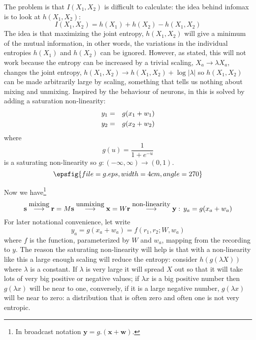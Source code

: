 \documentclass[12pt]{article}
\begin{document}
The problem is that $I(X_1,X_2)$ is difficult to calculate: the idea
behind infomax is to look at $h(X_1,X_2)$:
\begin{equation}
I(X_1,X_2)=h(X_1)+h(X_2)-h(X_1,X_2)
\end{equation}
The idea is that maximizing the joint entropy, $h(X_1,X_2)$ will give
a minimum of the mutual information, in other words, the variations in
the individual entropies $h(X_1)$ and $h(X_2)$ can be
ignored. However, as stated, this will not work because the entropy
can be increased by a trivial scaling, $X_a\rightarrow \lambda X_a$,
changes the joint entropy, $h(X_1,X_2)\rightarrow
h(X_1,X_2)+\log{|\lambda|}$ so $h(X_1,X_2)$ can be made arbitrarily
large by scaling, something that tells us nothing about mixing and
unmixing. Inspired by the behaviour of neurons, in
\cite{BellSejnowski1995} this is solved by adding a saturation
non-linearity:
\begin{eqnarray}
y_1&=&g(x_1+w_1)\cr
y_2&=&g(x_2+w_2)
\end{eqnarray}
where
\begin{equation}
g(u)=\frac{1}{1+e^{-u}}
\end{equation}
is a saturating non-linearity so $g:(-\infty,\infty)\rightarrow (0,1)$.
\begin{equation}
\epsfig{file=g.eps,width=4cm,angle=270}
\end{equation}

Now we have\footnote{In broadcast notation $\mathbf{y}=g.(\mathbf{x}+\mathbf{w})$.}
\begin{equation}
{\bf s}\stackrel{\mbox{mixing}}{\longrightarrow}{\bf r}=M{\bf s}\stackrel{\mbox{unmixing}}{\longrightarrow}{\bf x}=W{\bf r}\stackrel{\mbox{non-linearity}}{\longrightarrow}{\bf y}:\,y_a=g(x_a+w_a)
\end{equation}
For later notational convenience, let write
\begin{equation}
y_a=g(x_a+w_a)=f(r_1,r_2;W,w_a)
\end{equation}
where $f$ is the function, parameterized by $W$ and $w_a$, mapping
from the recording to $y$. The reason the saturating non-linearity will
help is that with a non-linearity like this a large enough scaling
will reduce the entropy: consider $h(g(\lambda X))$ where $\lambda$ is
a constant. If $\lambda$ is very large it will spread $X$ out so that
it will take lots of very big positive or negative values; if $\lambda
x$ is a big positive number then $g(\lambda x)$ will be near to one,
conversely, if it is a large negative number, $g(\lambda x)$ will be
near to zero: a distribution that is often zero and often one is not
very entropic.
\end{document}
